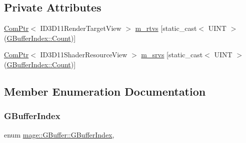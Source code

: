 \subsection*{Private Attributes}
\begin{DoxyCompactItemize}
\item 
\hyperlink{namespacemage_ae74f374780900893caa5555d1031fd79}{Com\+Ptr}$<$ I\+D3\+D11\+Render\+Target\+View $>$ \hyperlink{structmage_1_1_g_buffer_aae23d7eabe9c4dec3f0c9a7e40965935}{m\+\_\+rtvs} \mbox{[}static\+\_\+cast$<$ U\+I\+NT $>$(\hyperlink{structmage_1_1_g_buffer_a72f0fc0f46052fdc9872c48c57894607ae93f994f01c537c4e2f7d8528c3eb5e9}{G\+Buffer\+Index\+::\+Count})\mbox{]}
\item 
\hyperlink{namespacemage_ae74f374780900893caa5555d1031fd79}{Com\+Ptr}$<$ I\+D3\+D11\+Shader\+Resource\+View $>$ \hyperlink{structmage_1_1_g_buffer_a5a73e6c70c86cfb818e99c98e1bd11e4}{m\+\_\+srvs} \mbox{[}static\+\_\+cast$<$ U\+I\+NT $>$(\hyperlink{structmage_1_1_g_buffer_a72f0fc0f46052fdc9872c48c57894607ae93f994f01c537c4e2f7d8528c3eb5e9}{G\+Buffer\+Index\+::\+Count})\mbox{]}
\end{DoxyCompactItemize}


\subsection{Member Enumeration Documentation}
\hypertarget{structmage_1_1_g_buffer_a72f0fc0f46052fdc9872c48c57894607}{}\label{structmage_1_1_g_buffer_a72f0fc0f46052fdc9872c48c57894607} 
\subsubsection{\texorpdfstring{G\+Buffer\+Index}{GBufferIndex}}
{\footnotesize\ttfamily enum \hyperlink{structmage_1_1_g_buffer_a72f0fc0f46052fdc9872c48c57894607}{mage\+::\+G\+Buffer\+::\+G\+Buffer\+Index}\hspace{0.3cm}{\ttfamily [strong]}, {\ttfamily [private]}}

